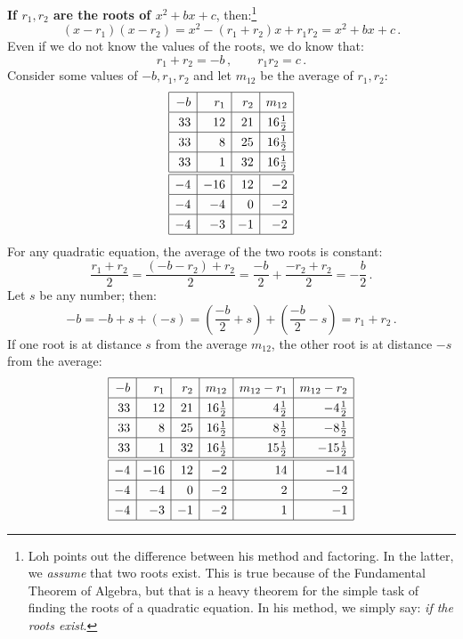 \documentclass[12pt,a4paper]{article}
\begin{document}
\textbf{If $r_1,r_2$ are the roots of $x^2+bx+c$}, then:\footnote{Loh points out the difference between his method and factoring. In the latter, we \emph{assume} that two roots exist. This is true because of the Fundamental Theorem of Algebra, but that is a heavy theorem for the simple task of finding the roots of a quadratic equation. In his method, we simply say: \emph{if the roots exist}.}
\[
(x-r_1)(x-r_2)=x^2 - (r_1+r_2)x + r_1r_2=x^2+bx+c\,.
\]
Even if we do not know the values of the roots, we do know that:
\[
r_1+r_2 = -b\,,\quad\quad r_1r_2=c\,.
\]
Consider some values of $-b,r_1,r_2$ and let $m_{12}$ be the average of $r_1,r_2$:
\[
\renewcommand{\arraystretch}{1.3}
\begin{array}{|r|r|r|r|}
\hline
-b& r_1 & r_2 &m_{12}\\\hline
33 & 12 & 21 & 16\frac{1}{2}\\\hline
33 & 8 & 25 & 16\frac{1}{2}\\\hline
33 & 1 & 32 & 16\frac{1}{2}\\\hline
\hline
-4 & -16 & 12 & -2 \\\hline
-4 & -4 & 0 & -2 \\\hline
-4 & -3 & -1 & -2 \\\hline
\end{array}
\]
For any quadratic equation, the average of the two roots is constant:
\[
\frac{r_1+r_2}{2}=
\frac{(-b-r_2)+r_2}{2}=
\frac{-b}{2}+\frac{-r_2+r_2}{2}=
-\frac{b}{2}\,.
\]
Let $s$ be any number; then:
\[
-b=-b+s+(-s)=\left(\frac{-b}{2}+s\right) + \left(\frac{-b}{2}-s\right)=r_1+r_2\,.
\]
If one root is at distance $s$ from the average $m_{12}$, the other root is at distance $-s$ from  the average:
\[
\renewcommand{\arraystretch}{1.3}
\begin{array}{|r|r|r|r|r|r|}
\hline
-b& r_1 & r_2 & m_{12}& m_{12}-r_1 & m_{12}-r_2\\\hline
33 & 12 & 21 & 16\frac{1}{2}&4\frac{1}{2} & -4\frac{1}{2}  \\\hline
33 & 8 & 25 & 16\frac{1}{2}&8\frac{1}{2}&-8\frac{1}{2}\\\hline
33 & 1 & 32 & 16\frac{1}{2}&15\frac{1}{2}&-15\frac{1}{2}\\\hline
\hline
-4 & -16 & 12 & -2 &14& -14\\\hline
-4 & -4 & 0 & -2&2&-2 \\\hline
-4 & -3 & -1 & -2&1&-1 \\\hline
\end{array}
\]

\bigskip
\end{document}
